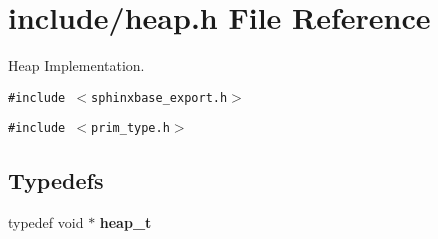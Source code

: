\section{include/heap.h File Reference}
\label{heap_8h}
Heap Implementation.  


{\tt \#include $<$sphinxbase\_\-export.h$>$}\par
{\tt \#include $<$prim\_\-type.h$>$}\par
\subsection*{Typedefs}
\begin{CompactItemize}
\item 
typedef void $\ast$ \textbf{heap\_\-t}\label{heap_8h_940dac139dbe58a03237e72a176833a2}

\end{CompactItemize}
